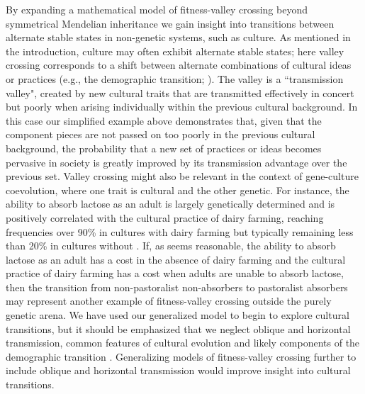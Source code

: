 \documentclass[review,3p,authoryear]{elsarticle}
\begin{document}
By expanding a mathematical model of fitness-valley crossing beyond symmetrical Mendelian inheritance we gain insight into transitions between alternate stable states in non-genetic systems, such as culture.
As mentioned in the introduction, culture may often exhibit alternate stable states; here valley crossing corresponds to a shift between alternate combinations of cultural ideas or practices (e.g., the demographic transition; \citealp{Mulder1998}).
The valley is a ``transmission valley", created by new cultural traits that are transmitted effectively in concert but poorly when arising individually within the previous cultural background.
In this case our simplified example above demonstrates that, 
given that the component pieces are not passed on too poorly in the previous cultural background, the probability that a new set of practices or ideas becomes pervasive in society is greatly improved by its transmission advantage over the previous set.
Valley crossing might also be relevant in the context of gene-culture coevolution, where one trait is cultural and the other genetic.
For instance, the ability to absorb lactose as an adult is largely genetically determined and is positively correlated with the cultural practice of dairy farming, reaching frequencies over 90\% in cultures with dairy farming but typically remaining less than 20\% in cultures without \citep{Feldman1996}.
If, as seems reasonable, the ability to absorb lactose as an adult has a cost in the absence of dairy farming and the cultural practice of dairy farming has a cost when adults are unable to absorb lactose, then the transition from non-pastoralist non-absorbers to pastoralist absorbers may represent another example of fitness-valley crossing outside the purely genetic arena. 
We have used our generalized model to begin to explore cultural transitions, 
but it should be emphasized that we neglect oblique and horizontal transmission, common features of cultural evolution \citep{CavalliSforza1981} and likely components of the demographic transition \citep{Ihara2004}.
Generalizing models of fitness-valley crossing further to include oblique and horizontal transmission would improve insight into cultural transitions.
\end{document}
